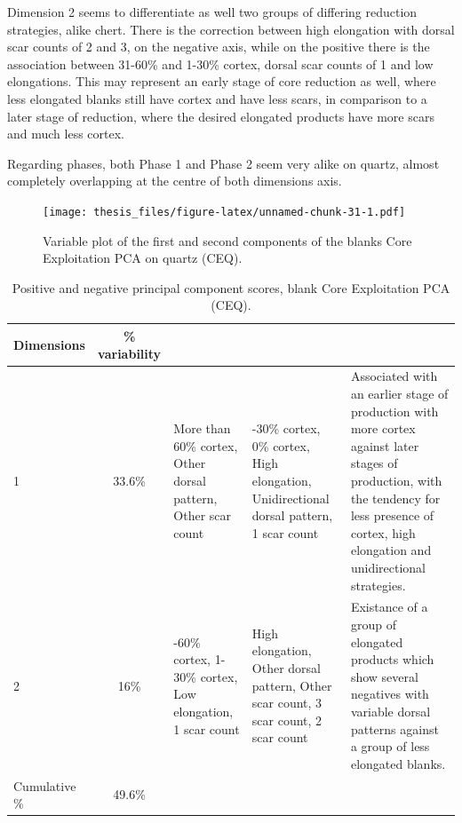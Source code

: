\documentclass[12pt,twoside]{reedthesis}
\begin{document}
Dimension 2 seems to differentiate as well two groups of differing reduction strategies, alike chert. There is the correction between high elongation with dorsal scar counts of 2 and 3, on the negative axis, while on the positive there is the association between 31-60\% and 1-30\% cortex, dorsal scar counts of 1 and low elongations. This may represent an early stage of core reduction as well, where less elongated blanks still have cortex and have less scars, in comparison to a later stage of reduction, where the desired elongated products have more scars and much less cortex.

Regarding phases, both Phase 1 and Phase 2 seem very alike on quartz, almost completely overlapping at the centre of both dimensions axis.
\begin{figure}
\centering
\texttt{[image: thesis\_files/figure-latex/unnamed-chunk-31-1.pdf]}
\caption{\label{fig:unnamed-chunk-31}Variable plot of the first and second components of the blanks Core Exploitation PCA on quartz (CEQ).}
\end{figure}
\begin{table}[!h]

\caption{\label{tab:unnamed-chunk-32}Positive and negative principal component scores, blank Core Exploitation PCA (CEQ).}
\centering
\begin{tabular}[t]{lc>{\raggedright\arraybackslash}p{3cm}>{\raggedright\arraybackslash}p{3cm}>{\raggedright\arraybackslash}p{3cm}}
\toprule
\multicolumn{1}{c}{\textbf{Dimensions}} & \multicolumn{1}{c}{\textbf{\% variability}} & \multicolumn{1}{>{\centering\arraybackslash}p{3cm}}{\textbf{+}} & \multicolumn{1}{>{\centering\arraybackslash}p{3cm}}{\textbf{-}} & \multicolumn{1}{>{\centering\arraybackslash}p{3cm}}{\textbf{Interpretation}}\\
\midrule
1 & 33.6\% & More than 60\% cortex, Other dorsal pattern, Other scar count & 1-30\% cortex, 0\% cortex, High elongation, Unidirectional dorsal pattern, 1 scar count & Associated with an earlier stage of production with more cortex against later stages of production, with the
                               tendency for less presence of cortex, high elongation and unidirectional strategies.\\
2 & 16\% & 31-60\% cortex, 1-30\% cortex, Low elongation, 1 scar count & High elongation, Other dorsal pattern, Other scar count, 3 scar count, 2 scar count & Existance of a group of elongated products which show several negatives with variable dorsal patterns 
                               against a group of less elongated blanks.\\
Cumulative \% & 49.6\% &  &  & \\
\bottomrule
\end{tabular}
\end{table}
\end{document}
